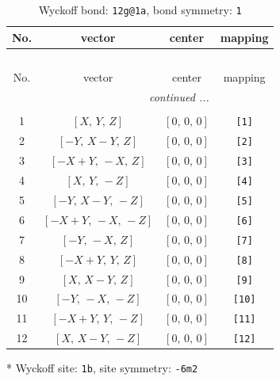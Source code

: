 \documentclass[fleqn,8pt]{jsarticle}
\begin{document}
\begin{longtable}{cccc}
\caption{Wyckoff bond: {\tt 12g@1a}, bond symmetry: {\tt 1}}
 \\
 \hline \hline
No. & vector & center & mapping \\ \hline \endfirsthead

\multicolumn{3}{l}{\tablename\ \thetable{}} \\
 \hline \hline
No. & vector & center & mapping \\ \hline \endhead

 \hline \hline
\multicolumn{3}{r}{\footnotesize\it continued ...} \\ \endfoot

 \hline \hline
\multicolumn{3}{r}{} \\ \endlastfoot

1 & $\left[ X,\, Y,\, Z \right]$ & $\left[ 0,\, 0,\, 0 \right]$ & {\tt [1]} \\ \hline
2 & $\left[ - Y,\, X - Y,\, Z \right]$ & $\left[ 0,\, 0,\, 0 \right]$ & {\tt [2]} \\ \hline
3 & $\left[ - X + Y,\, - X,\, Z \right]$ & $\left[ 0,\, 0,\, 0 \right]$ & {\tt [3]} \\ \hline
4 & $\left[ X,\, Y,\, - Z \right]$ & $\left[ 0,\, 0,\, 0 \right]$ & {\tt [4]} \\ \hline
5 & $\left[ - Y,\, X - Y,\, - Z \right]$ & $\left[ 0,\, 0,\, 0 \right]$ & {\tt [5]} \\ \hline
6 & $\left[ - X + Y,\, - X,\, - Z \right]$ & $\left[ 0,\, 0,\, 0 \right]$ & {\tt [6]} \\ \hline
7 & $\left[ - Y,\, - X,\, Z \right]$ & $\left[ 0,\, 0,\, 0 \right]$ & {\tt [7]} \\ \hline
8 & $\left[ - X + Y,\, Y,\, Z \right]$ & $\left[ 0,\, 0,\, 0 \right]$ & {\tt [8]} \\ \hline
9 & $\left[ X,\, X - Y,\, Z \right]$ & $\left[ 0,\, 0,\, 0 \right]$ & {\tt [9]} \\ \hline
10 & $\left[ - Y,\, - X,\, - Z \right]$ & $\left[ 0,\, 0,\, 0 \right]$ & {\tt [10]} \\ \hline
11 & $\left[ - X + Y,\, Y,\, - Z \right]$ & $\left[ 0,\, 0,\, 0 \right]$ & {\tt [11]} \\ \hline
12 & $\left[ X,\, X - Y,\, - Z \right]$ & $\left[ 0,\, 0,\, 0 \right]$ & {\tt [12]} \\
\end{longtable}
* Wyckoff site: {\tt 1b}, site symmetry: {\tt -6m2}
\renewcommand{\arraystretch}{1.2}
\end{document}
